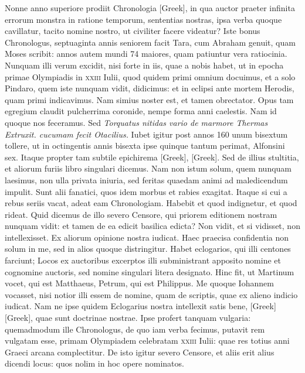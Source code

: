 \begin{parnumbers}
{}
\lnr{}Nonne anno superiore prodiit Chronologia
\textgreek{[Greek]}, in qua auctor praeter infinita errorum monstra
in ratione temporum, sententias nostras, ipsa verba quoque cavillatur,
tacito nomine nostro, ut civiliter facere videatur?
\lnr{}Iste bonus
Chronologus, septuaginta annis seniorem facit Tara, cum Abraham
genuit, quam Moses scribit: annos autem mundi 74 maiores,
quam patiuntur vera ratiocinia.
\lnr{}Nunquam illi verum excidit, nisi
forte in iis, quae a nobis habet, ut in epocha primae Olympiadis in
\textsc{xxiii} Iulii, quod quidem primi omnium docuimus, et a solo
Pindaro, quem iste nunquam vidit, didicimus: et in eclipsi ante
mortem Herodis, quam primi indicavimus.
\lnr{}Nam simius noster est,
et tamen obrectator.
\lnr{}Opus tam egregium claudit pulcherrima
coronide, nempe forma anni caelestis.
\lnr{}Nam id quoque nos feceramus.
\lnr{}Sed
	\textit{Torquatus nitidas vario de marmore Thermas}
	\textit{Extruxit. cucumam fecit Otacilius.}
Iubet igitur post annos 160 unum bisextum tollere, ut in octingentis
annis bisexta ipse quinque tantum perimat, Alfonsini sex.
\lnr{}Itaque propter tam subtile epichirema \textgreek{[Greek]}, \textgreek{[Greek]}.
\lnr{}Sed de illius stultitia, et aliorum furiis libro singulari dicemus.
\lnr{}Nam non istum solum, quem nunquam laesimus, non ulla privata iniuria,
sed feritas quaedam animi ad maledicendum impulit.
\lnr{}Sunt alii
fanatici, quos idem morbus et rabies exagitat.
\lnr{}Itaque si cui a rebus
seriis vacat, adeat eam Chronologiam.
\lnr{}Habebit et quod indignetur,
et quod rideat.
\lnr{}Quid dicemus de illo severo Censore, qui priorem
editionem nostram nunquam vidit: et tamen de ea edicit basilica
edicta?
\lnr{}Non vidit, et si vidisset, non intellexisset.
\lnr{}Ex aliorum opinione
nostra iudicat.
\lnr{}Haec praecisa confidentia non solum in me,
sed in alios quoque distringitur.
\lnr{}Habet eclogarios, qui illi centones
farciunt;
\lnr{}Locos ex auctoribus excerptos illi subministrant apposito
nomine et cognomine auctoris, sed nomine singulari litera designato.
\lnr{}Hinc fit, ut Martinum vocet, qui est Matthaeus, Petrum, qui est
Philippus.
\lnr{}Me quoque Iohannem vocasset, nisi notior illi essem de
nomine, quam de scriptis, quae ex alieno indicio iudicat.
\lnr{}Nam
ne ipse quidem Eclogarius nostra intellexit satis bene, \textgreek{[Greek]}
\textgreek{[Greek]}, quae sunt doctrinae nostrae.
\lnr{}Ipse profert tanquam vulgaria: quemadmodum ille Chronologus, de quo iam
verba fecimus, putavit rem vulgatam esse, primam Olympiadem
celebratam \textsc{xxiii} Iulii:
 quae res totius anni Graeci arcana complectitur.
\lnr{}De isto igitur severo Censore, et aliis erit alius dicendi locus:
quos nolim in hoc opere nominatos.


\end{parnumbers}

